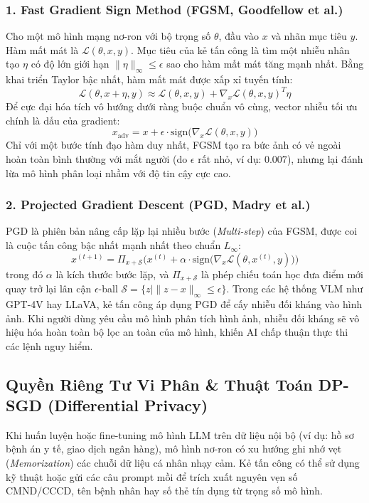 \subsubsection{1. Fast Gradient Sign Method (FGSM, Goodfellow et al.)}
Cho một mô hình mạng nơ-ron với bộ trọng số $\theta$, đầu vào $x$ và nhãn mục tiêu $y$. Hàm mất mát là $\mathcal{L}(\theta, x, y)$.
Mục tiêu của kẻ tấn công là tìm một nhiễu nhân tạo $\eta$ có độ lớn giới hạn $\|\eta\|_\infty \le \epsilon$ sao cho hàm mất mát tăng mạnh nhất.
Bằng khai triển Taylor bậc nhất, hàm mất mát được xấp xỉ tuyến tính:
\begin{equation}
\mathcal{L}(\theta, x + \eta, y) \approx \mathcal{L}(\theta, x, y) + \nabla_x \mathcal{L}(\theta, x, y)^T \eta
\end{equation}
Để cực đại hóa tích vô hướng dưới ràng buộc chuẩn vô cùng, vector nhiễu tối ưu chính là dấu của gradient:
\begin{equation}
x_{\text{adv}} = x + \epsilon \cdot \text{sign}\Big(\nabla_x \mathcal{L}(\theta, x, y)\Big)
\label{eq:fgsm-formula}
\end{equation}
Chỉ với một bước tính đạo hàm duy nhất, FGSM tạo ra bức ảnh có vẻ ngoài hoàn toàn bình thường với mắt người (do $\epsilon$ rất nhỏ, ví dụ: $0.007$), nhưng lại đánh lừa mô hình phân loại nhầm với độ tin cậy cực cao.

\subsubsection{2. Projected Gradient Descent (PGD, Madry et al.)}
PGD là phiên bản nâng cấp lặp lại nhiều bước (\textit{Multi-step}) của FGSM, được coi là cuộc tấn công bậc nhất mạnh nhất theo chuẩn $L_\infty$:
\begin{equation}
x^{(t+1)} = \Pi_{x + \mathcal{S}} \Bigg( x^{(t)} + \alpha \cdot \text{sign}\Big(\nabla_x \mathcal{L}(\theta, x^{(t)}, y)\Big) \Bigg)
\label{eq:pgd-formula}
\end{equation}
trong đó $\alpha$ là kích thước bước lặp, và $\Pi_{x + \mathcal{S}}$ là phép chiếu toán học đưa điểm mới quay trở lại lân cận $\epsilon$-ball $\mathcal{S} = \{z \mid \|z - x\|_\infty \le \epsilon\}$.
Trong các hệ thống VLM như GPT-4V hay LLaVA, kẻ tấn công áp dụng PGD để cấy nhiễu đối kháng vào hình ảnh. Khi người dùng yêu cầu mô hình phân tích hình ảnh, nhiễu đối kháng sẽ vô hiệu hóa hoàn toàn bộ lọc an toàn của mô hình, khiến AI chấp thuận thực thi các lệnh nguy hiểm.

\subsection{Quyền Riêng Tư Vi Phân \& Thuật Toán DP-SGD (Differential Privacy)}
\label{subsec:differential-privacy-dpsgd}
Khi huấn luyện hoặc fine-tuning mô hình LLM trên dữ liệu nội bộ (ví dụ: hồ sơ bệnh án y tế, giao dịch ngân hàng), mô hình nơ-ron có xu hướng ghi nhớ vẹt (\textit{Memorization}) các chuỗi dữ liệu cá nhân nhạy cảm. Kẻ tấn công có thể sử dụng kỹ thuật  hoặc gửi các câu prompt mồi để trích xuất nguyên vẹn số CMND/CCCD, tên bệnh nhân hay số thẻ tín dụng từ trọng số mô hình.

